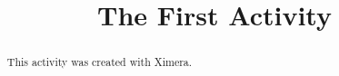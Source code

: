 \documentclass{ximera}
\title{The First Activity}
\begin{document}
  
\begin{abstract}  
This activity was created with Ximera.
\end{abstract}  
\maketitle  


\begin{onlineOnly}
  \begin{center}
  \end{center}
\end{onlineOnly}

\begin{onlineOnly}
  \begin{center}
  \end{center}
\end{onlineOnly}


\begin{onlineOnly}
  \begin{center}
  \end{center}
\end{onlineOnly}


\begin{onlineOnly}
  \begin{center}
  \end{center}
\end{onlineOnly}

\begin{onlineOnly}
  \begin{center}
  \end{center}
\end{onlineOnly}

\begin{onlineOnly}
  \begin{center}    
  \end{center}
\end{onlineOnly}


\begin{onlineOnly}
  \begin{center}    
  \end{center}
\end{onlineOnly}


\begin{onlineOnly}
  \begin{center}    
  \end{center}
\end{onlineOnly}
\end{document}
